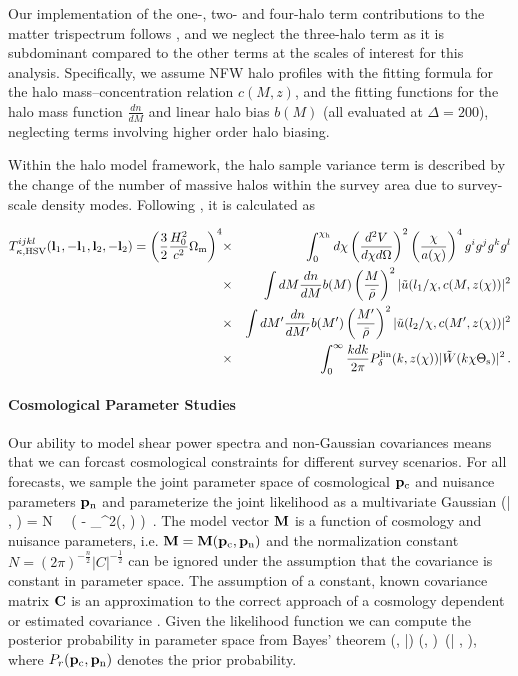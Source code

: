 Our implementation of the one-, two- and four-halo term contributions to the matter trispectrum follows \citet{CH01}, and we neglect the three-halo term as it is subdominant compared to the other terms at the scales of interest for this analysis. Specifically, we assume NFW halo profiles \citep{NFW} with the \citet{Bhattacharya11} fitting formula for the halo mass--concentration relation $c(M,z)$, and the \citet{Tinker2008} fitting functions for the halo mass function $\frac{ dn}{dM}$ and linear halo bias $b(M)$ (all evaluated at $\Delta = 200$), neglecting terms involving higher order halo biasing.


Within the halo model framework, the halo sample variance term is described by the change of the number of massive halos within the survey area due to survey-scale density modes. Following \citet{sht09}, it is calculated as

\begin{eqnarray}
T_{\kappa,\rm{HSV}}^{ijkl}(\mathbf l_1,-\mathbf l_1,\mathbf l_2,-\mathbf l_2)= \left(\frac{3}{2}\frac{H_0^2}{c^2}\Omega_{\mathrm m}\right)^4 &\times&  \int_0^{\chi_\mathrm h}d\chi \left(\frac{d^2 V}{d\chi d\Omega}\right)^2 \left(\frac{\chi}{a(\chi)}\right)^4 g^i g^j g^k g^l \nonumber \\
&\times&  \int d M \frac{d n}{d M} b(M)\left(\frac{M}{\bar{\rho}}\right)^2 |\tilde{u}(l_1/\chi, c(M,z(\chi))|^2 \nonumber \\
 &\times& \int d M' \frac{d n}{d M'} b(M')\left(\frac{M'}{\bar{\rho}}\right)^2 |\tilde{u}(l_2/\chi, c(M',z(\chi))|^2 \nonumber \\
 &\times&  \int_0^\infty \frac{k dk}{2\pi}P_\delta^{\mathrm{lin}}(k,z(\chi))|\tilde W(k\chi \Theta_{\mathrm s})|^2 \,.
\end{eqnarray}


\paragraph{Cosmological Parameter Studies} Our ability to model shear power spectra and non-Gaussian covariances means that we can forcast cosmological constraints for different survey scenarios. For all forecasts, we sample the joint parameter space of cosmological $\mathbf p_\mathrm{c}$ and nuisance parameters $\mathbf p_\mathrm{n}$ and parameterize the joint likelihood as a multivariate Gaussian
\be
\label{eq:like}
\like (\D| \pco, \pnu) = N \, \times \, \exp \biggl( - _{\chi^2(\pco, \pnu)}  \biggr) \,.
\ee
The model vector $\mathbf M$ is a function of cosmology and nuisance parameters, i.e. $\mathbf M=\mathbf M(\mathbf p_\mathrm{c}, \mathbf p_\mathrm{n})$ and the normalization constant $N=(2 \pi)^{-\frac{n}{2}} |C|^{-\frac{1}{2}}$ can be ignored under the assumption that the covariance is constant in parameter space. The assumption of a constant, known covariance matrix $\mathbf C$ is an approximation to the correct approach of a cosmology dependent or estimated covariance \citep[see][for further details]{esh09, seh16}.
Given the likelihood function we can compute the posterior probability in parameter space from Bayes' theorem
\be
\label{eq:bayes}
\prob(\pco, \pnu|\D) \propto \probr (\pco, \pnu) \,\like (\D| \pco, \pnu),
\ee
where $P_r (\mathbf p_\mathrm{c}, \mathbf p_\mathrm{n})$ denotes the prior probability.

